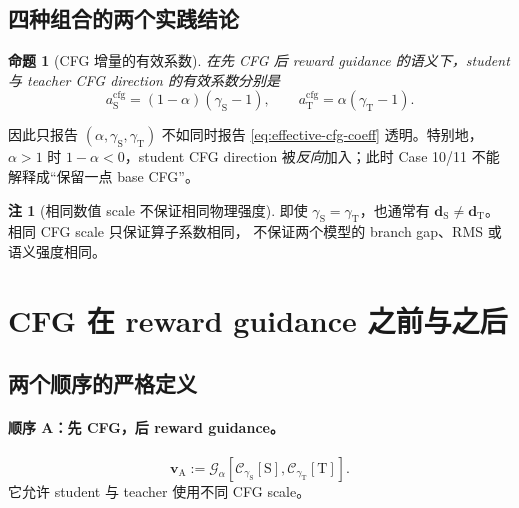 \documentclass[11pt,a4paper]{article}
\newcommand{\C}{\mathcal{C}}
\newcommand{\G}{\mathcal{G}}
\newcommand{\vfield}{\bm{v}}
\newcommand{\student}{\mathrm{S}}
\newcommand{\teacher}{\mathrm{T}}
\theoremstyle{definition}
\newtheorem{remark}[definition]{注}
\theoremstyle{plain}
\newtheorem{proposition}[definition]{命题}
\begin{document}
\subsection{四种组合的两个实践结论}

\begin{proposition}[CFG 增量的有效系数]
在先 CFG 后 reward guidance 的语义下，student 与 teacher CFG direction 的有效系数分别是
\begin{equation}
  a_\student^{\mathrm{cfg}}
  =(1-\alpha)(\gamma_\student-1),
  \qquad
  a_\teacher^{\mathrm{cfg}}
  =\alpha(\gamma_\teacher-1).
  \label{eq:effective-cfg-coeff}
\end{equation}
\end{proposition}

因此只报告 $(\alpha,\gamma_\student,\gamma_\teacher)$ 不如同时报告
\eqref{eq:effective-cfg-coeff} 透明。特别地，$\alpha>1$ 时
$1-\alpha<0$，student CFG direction 被\emph{反向}加入；此时 Case 10/11
不能解释成``保留一点 base CFG''。

\begin{remark}[相同数值 scale 不保证相同物理强度]
即使 $\gamma_\student=\gamma_\teacher$，也通常有
$\bm d_\student\neq\bm d_\teacher$。相同 CFG scale 只保证算子系数相同，
不保证两个模型的 branch gap、RMS 或语义强度相同。
\end{remark}

\section{CFG 在 reward guidance 之前与之后}

\subsection{两个顺序的严格定义}

\paragraph{顺序 A：先 CFG，后 reward guidance。}
\begin{equation}
  \vfield_{\mathrm{A}}
  :=
  \G_\alpha\!\left[
    \C_{\gamma_\student}[\student],
    \C_{\gamma_\teacher}[\teacher]
  \right].
  \label{eq:order-a}
\end{equation}
它允许 student 与 teacher 使用不同 CFG scale。
\end{document}
